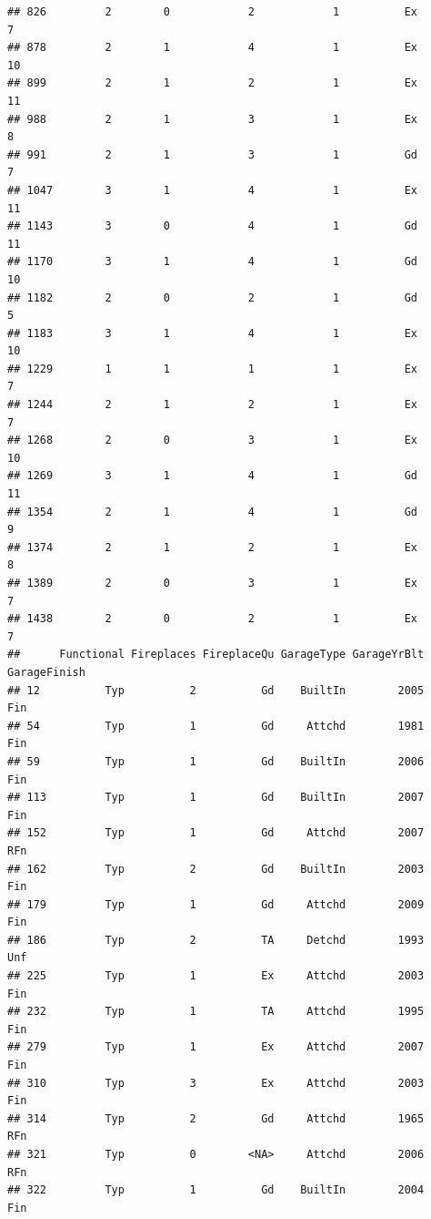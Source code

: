 \documentclass[]{article}
\begin{document}
\begin{verbatim}
## 826         2        0            2            1          Ex            7
## 878         2        1            4            1          Ex           10
## 899         2        1            2            1          Ex           11
## 988         2        1            3            1          Ex            8
## 991         2        1            3            1          Gd            7
## 1047        3        1            4            1          Ex           11
## 1143        3        0            4            1          Gd           11
## 1170        3        1            4            1          Gd           10
## 1182        2        0            2            1          Gd            5
## 1183        3        1            4            1          Ex           10
## 1229        1        1            1            1          Ex            7
## 1244        2        1            2            1          Ex            7
## 1268        2        0            3            1          Ex           10
## 1269        3        1            4            1          Gd           11
## 1354        2        1            4            1          Gd            9
## 1374        2        1            2            1          Ex            8
## 1389        2        0            3            1          Ex            7
## 1438        2        0            2            1          Ex            7
##      Functional Fireplaces FireplaceQu GarageType GarageYrBlt GarageFinish
## 12          Typ          2          Gd    BuiltIn        2005          Fin
## 54          Typ          1          Gd     Attchd        1981          Fin
## 59          Typ          1          Gd    BuiltIn        2006          Fin
## 113         Typ          1          Gd    BuiltIn        2007          Fin
## 152         Typ          1          Gd     Attchd        2007          RFn
## 162         Typ          2          Gd    BuiltIn        2003          Fin
## 179         Typ          1          Gd     Attchd        2009          Fin
## 186         Typ          2          TA     Detchd        1993          Unf
## 225         Typ          1          Ex     Attchd        2003          Fin
## 232         Typ          1          TA     Attchd        1995          Fin
## 279         Typ          1          Ex     Attchd        2007          Fin
## 310         Typ          3          Ex     Attchd        2003          Fin
## 314         Typ          2          Gd     Attchd        1965          RFn
## 321         Typ          0        <NA>     Attchd        2006          RFn
## 322         Typ          1          Gd    BuiltIn        2004          Fin

\end{verbatim}
\end{document}
